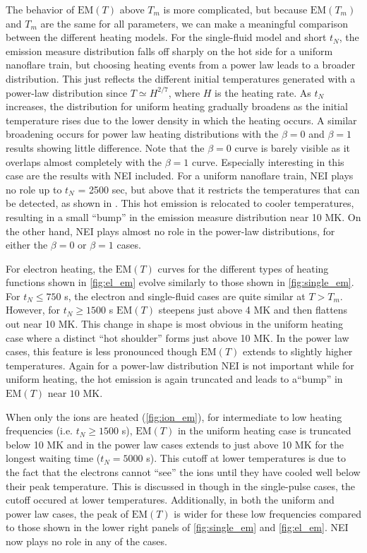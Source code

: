 \documentclass[preprint,linenumbers]{aastex}
\begin{document}
	\par The behavior of $\mathrm{EM}(T)$ above $T_m$ is more complicated, but because $\mathrm{EM}(T_m)$ and $T_m$ are the same for all parameters, we can make a meaningful comparison between the different heating models. For the single-fluid model and short $t_N$, the emission measure distribution falls off sharply on the hot side for a uniform nanoflare train, but choosing heating events from a power law leads to a broader distribution. This just reflects the different initial temperatures generated with a power-law distribution since $T \simeq H^{2/7}$, where $H$ is the heating rate. As $t_N$ increases, the distribution for uniform heating gradually broadens as the initial temperature rises due to the lower density in which the heating occurs. A similar broadening occurs for power law heating distributions with the $\beta=0$ and $\beta=1$ results showing little difference. Note that the $\beta=0$ curve is barely visible as it overlaps almost completely with the $\beta=1$ curve. Especially interesting in this case are the results with NEI included. For a uniform nanoflare train, NEI plays no role up to $t_N$ = 2500 sec, but above that it restricts the temperatures that can be detected, as shown in . This hot emission is relocated to cooler temperatures, resulting in a small ``bump'' in the emission measure distribution near 10 MK. On the other hand, NEI plays almost no role in the power-law distributions, for either the $\beta=0$ or $\beta=1$ cases.
	\par For electron heating, the $\mathrm{EM}(T)$ curves for the different types of heating functions shown in \autoref{fig:el_em} evolve similarly to those shown in \autoref{fig:single_em}. For $t_N\le750$ s, the electron and single-fluid cases are quite similar at $T>T_m$. However, for $t_N\ge1500$ s $\mathrm{EM}(T)$ steepens just above 4 MK and then flattens out near 10 MK. This change in shape is most obvious in the uniform heating case where a distinct ``hot shoulder'' forms just above 10 MK. In the power law cases, this feature is less pronounced though $\mathrm{EM}(T)$ extends to slightly higher temperatures. Again for a power-law distribution NEI is not important while for uniform heating, the hot emission is again truncated and leads to a``bump'' in $\mathrm{EM}(T)$ near $10$ MK.
	\par When only the ions are heated (\autoref{fig:ion_em}), for intermediate to low heating frequencies (i.e. $t_N\ge1500$ s), $\mathrm{EM}(T)$ in the uniform heating case is truncated below 10 MK and in the power law cases extends to just above 10 MK for the longest waiting time ($t_N=5000$ s). This cutoff at lower temperatures is due to the fact that the electrons cannot ``see'' the ions until they have cooled well below their peak temperature. This is discussed in  though in the single-pulse cases, the cutoff occured at lower temperatures. Additionally, in both the uniform and power law cases, the peak of $\mathrm{EM}(T)$ is wider for these low frequencies compared to those shown in the lower right panels of \autoref{fig:single_em} and \autoref{fig:el_em}. NEI now plays no role in any of the cases.
\end{document}
